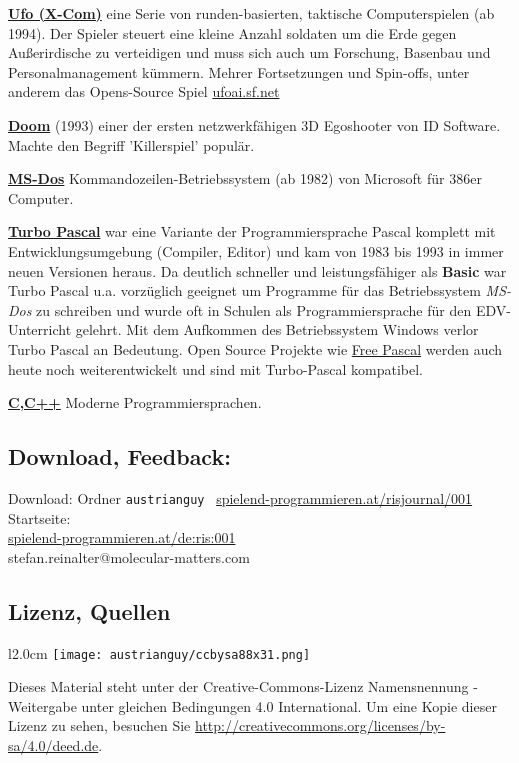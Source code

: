 \documentclass[10pt,a4paper,ngerman,twoside]{article} %
\begin{document}
\href{https://de.wikipedia.org/wiki/X-COM}{\textbf{Ufo (X-Com)}} eine Serie von runden-basierten, taktische Computerspielen (ab 1994). Der Spieler steuert eine  kleine Anzahl soldaten um die Erde gegen Außerirdische zu verteidigen und muss sich auch um Forschung, Basenbau und Personalmanagement kümmern. Mehrer Fortsetzungen und Spin-offs, unter anderem das Opens-Source Spiel \url{ufoai.sf.net}

\href{https://de.wikipedia.org/wiki/Doom}{\textbf{Doom}} (1993) einer der ersten netzwerkfähigen 3D Egoshooter von ID Software. Machte den Begriff 'Killerspiel' populär.

\href{https://de.wikipedia.org/wiki/MS_DOS}{\textbf{MS-Dos}} Kommandozeilen-Betriebssystem (ab 1982) von Microsoft für 386er Computer. 

\href{https://de.wikipedia.org/wiki/Turbo_Pascal}{\textbf{Turbo Pascal}} war eine Variante der Programmiersprache Pascal komplett mit Entwicklungsumgebung (Compiler, Editor) und kam von 1983 bis 1993 in immer neuen Versionen heraus. Da deutlich schneller und leistungsfähiger als \textbf{Basic} war Turbo Pascal u.a. vorzüglich geeignet um Programme für das Betriebssystem \textit{MS-Dos} zu schreiben und wurde oft in Schulen als Programmiersprache für den EDV-Unterricht gelehrt. Mit dem Aufkommen des Betriebssystem Windows verlor Turbo Pascal an Bedeutung. Open Source Projekte wie \href{https://de.wikipedia.org/wiki/Free_Pascal}{Free Pascal} werden auch heute noch weiterentwickelt und sind mit  Turbo-Pascal kompatibel.

\href{https://de.wikipedia.org/wiki/C_(Programmiersprache)}{\textbf{C,C++}} Moderne Programmiersprachen.

\subsection*{Download, Feedback:}
\footnotesize{
Download: Ordner \texttt{austrianguy} \Mundus\ \href{http://spielend-programmieren.at/risjournal/001}{spielend-programmieren.at/risjournal/001}\\
Startseite:\\
\href{http://spielend-programmieren.at/de:ris:001}{spielend-programmieren.at/de:ris:001}\\ 
\Letter\: stefan.reinalter@molecular-matters.com\\}
\normalsize 

\subsection*{Lizenz, Quellen}
\begin{wrapfigure}{l}{2.0cm}
\texttt{[image: austrianguy/ccbysa88x31.png]}
\end{wrapfigure}
Dieses Material steht unter der Creative-Commons-Lizenz Namensnennung - Weitergabe unter gleichen Bedingungen 4.0 International. Um eine Kopie dieser Lizenz zu sehen, besuchen Sie \url{http://creativecommons.org/licenses/by-sa/4.0/deed.de}.
\end{document}

